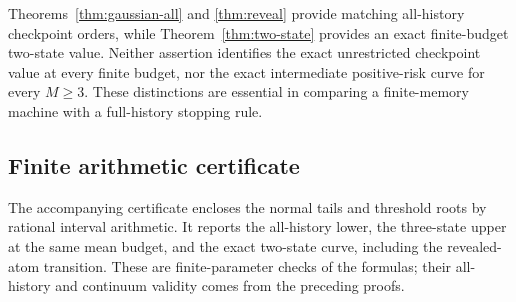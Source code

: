 Theorems~\ref{thm:gaussian-all} and \ref{thm:reveal} provide matching all-history checkpoint orders, while Theorem~\ref{thm:two-state} provides an exact finite-budget two-state value. Neither assertion identifies the exact unrestricted checkpoint value at every finite budget, nor the exact intermediate positive-risk curve for every $M\ge3$. These distinctions are essential in comparing a finite-memory machine with a full-history stopping rule.

\subsection*{Finite arithmetic certificate}

The accompanying certificate encloses the normal tails and threshold roots by rational interval arithmetic. It reports the all-history lower, the three-state upper at the same mean budget, and the exact two-state curve, including the revealed-atom transition. These are finite-parameter checks of the formulas; their all-history and continuum validity comes from the preceding proofs.
